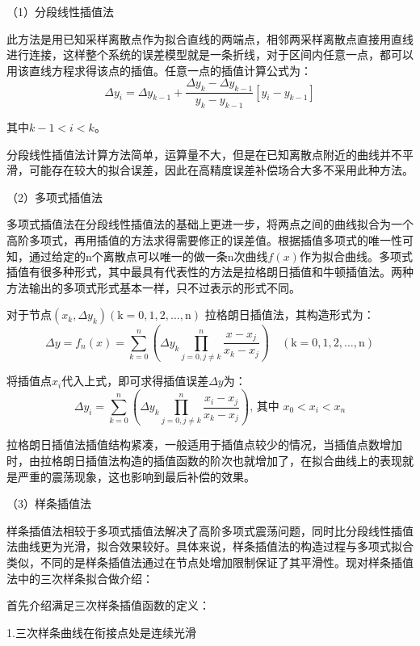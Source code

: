 \documentclass[type=master,oneside]{fduthesis}
\begin{document}
（1）分段线性插值法

此方法是用已知采样离散点作为拟合直线的两端点，相邻两采样离散点直接用直线进行连接，这样整个系统的误差模型就是一条折线，对于区间内任意一点，都可以用该直线方程求得该点的插值。任意一点的插值计算公式为：
\begin{equation}
  \Delta y_i=\Delta y_{k-1}+\frac{\Delta y_k-\Delta y_{k-1}}{y_k-y_{k-1}}\left[y_i-y_{k-1}\right]
\end{equation}

其中$k-1<i<k $。

分段线性插值法计算方法简单，运算量不大，但是在已知离散点附近的曲线并不平滑，可能存在较大的拟合误差，因此在高精度误差补偿场合大多不采用此种方法。

（2）多项式插值法

多项式插值法在分段线性插值法的基础上更进一步，将两点之间的曲线拟合为一个高阶多项式，再用插值的方法求得需要修正的误差值。根据插值多项式的唯一性可知，通过给定的n个离散点可以唯一的做一条n次曲线$f(x)$作为拟合曲线。多项式插值有很多种形式，其中最具有代表性的方法是拉格朗日插值和牛顿插值法。两种方法输出的多项式形式基本一样，只不过表示的形式不同。

对于节点$\left(x_k, \Delta y_k\right)(\mathrm{k}=0,1,2, \ldots, \mathrm{n})$ 拉格朗日插值法，其构造形式为：
\begin{equation}
  \Delta y=f_n(x)=\sum_{k=0}^n\left(\Delta y_k \prod_{j=0, j \neq k}^n \frac{x-x_j}{x_k-x_j}\right) \quad(\mathrm{k}=0,1,2, \ldots, \mathrm{n})
\end{equation}

将插值点$x_i$代入上式，即可求得插值误差$\Delta y$为：
\begin{equation}
  \Delta y_i=\sum_{k=0}^n\left(\Delta y_k \prod_{j=0, j \neq k}^n \frac{x_i-x_j}{x_k-x_j}\right) \text {, 其中 } x_0<x_i<x_n
\end{equation}

拉格朗日插值法插值结构紧凑，一般适用于插值点较少的情况，当插值点数增加时，由拉格朗日插值法构造的插值函数的阶次也就增加了，在拟合曲线上的表现就是严重的震荡现象，这也影响到最后补偿的效果。

（3）样条插值法

样条插值法相较于多项式插值法解决了高阶多项式震荡问题，同时比分段线性插值法曲线更为光滑，拟合效果较好。具体来说，样条插值法的构造过程与多项式拟合类似，不同的是样条插值法通过在节点处增加限制保证了其平滑性。现对样条插值法中的三次样条拟合做介绍：

首先介绍满足三次样条插值函数的定义：

1.三次样条曲线在衔接点处是连续光滑
\end{document}

